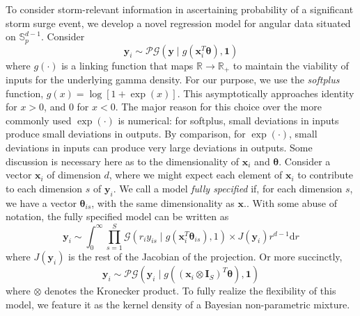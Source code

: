 To consider storm-relevant information in ascertaining probability of a significant storm surge event, we
    develop a novel regression model for angular data situated on $\mathbb{S}_p^{d-1}$.  Consider
    \[
        \bm{y}_i \sim \mathcal{PG}(\bm{y}\mid g(\bm{x}_i^T\bm{\theta}), \bm{1})    
    \]
    where $g(\cdot)$ is a linking function that maps $\mathbb{R}\to\mathbb{R}_+$ to maintain the
    viability of inputs for the underlying gamma density.  For our purpose, we use the \emph{softplus}
    function, $g(x) = \log[1 + \exp(x)]$.  This asymptotically approaches identity for $x > 0$, and 
    0 for $x < 0$. The major reason for this choice over the more commonly used $\exp(\cdot)$ is 
    numerical: for softplus, small deviations in inputs produce small deviations in outputs.  By comparison,
    for $\exp(\cdot)$, small deviations in inputs can produce very large deviations in outputs.  
    Some discussion is necessary here as to the dimensionality of $\bm{x}_i$ and $\bm{\theta}$.  Consider a vector 
    $\bm{x}_i$ of dimension $d$, where we might expect each element of $\bm{x}_i$ to contribute to each
    dimension $s$ of $\bm{y}_i$.  We call a model \emph{fully specified} if, for each dimension $s$, we
    have a vector $\bm{\theta}_{is}$, with the same dimensionality as $\bm{x}$.. With some abuse of 
    notation, the fully specified model can be written as
    \[
        \bm{y}_i \sim \int_0^{\infty}
            \prod_{s = 1}^S \mathcal{G}\left(r_iy_{is}\mid g(\bm{x}_i^T\bm{\theta}_{is}), 1\right) \times J(\bm{y}_i) r^{d-1}\text{d}r
    \]
    where $J(\bm{y}_i)$ is the rest of the Jacobian of the projection.  Or more succinctly, 
    \[
        \bm{y}_i \sim \mathcal{PG}\left(\bm{y}_i \mid g((\bm{x}_i \otimes \bm{I}_{S})^T\bm{\theta}), \bm{1}\right)
    \]
    where $\otimes$ denotes the Kronecker product.  To fully realize the flexibility of this model,
    we feature it as the kernel density of a Bayesian non-parametric mixture.
